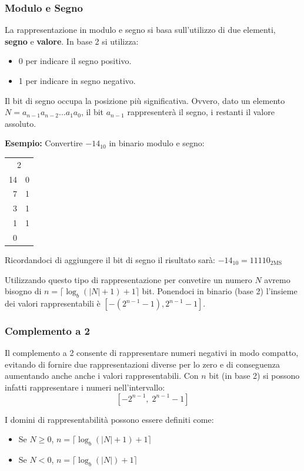 \documentclass[oneside]{scrbook}
\begin{document}
\subsubsection{Modulo e Segno}
La rappresentazione in modulo e segno si basa sull'utilizzo di due elementi, \textbf{segno} e \textbf{valore}.
In base 2 si utilizza:
\begin{itemize}
    \item 0 per indicare il segno positivo.
    \item 1 per indicare in segno negativo. 
\end{itemize}
Il bit di segno occupa la posizione più significativa. Ovvero, dato un elemento $N = a_{n-1}a_{n-2}...a_1a_0$, il bit $a_{n-1}$ rappresenterà il segno, i restanti il valore assoluto. 

\textbf{Esempio:}  
Convertire $-14_{10}$ in binario modulo e segno:

\begin{center}
\begin{tabular}{r|r}
    \multicolumn{2}{c}{2} \\
    14 & 0 \\
    7 & 1 \\
    3 & 1 \\
    1 & 1 \\
    0
\end{tabular}
\end{center}

Ricordandoci di aggiungere il bit di segno il risultato sarà: $-14_{10} = 11110_{2\text{MS}}$

Utilizzando questo tipo di rappresentazione per convetire un numero $N$ avremo bisogno di $n = \lceil \log_b(|N| + 1) +1 \rceil$ bit. Ponendoci in binario (base 2) l'insieme dei valori rappresentabili è $[-(2^{n-1}-1), 2^{n-1}-1]$.

\subsubsection{Complemento a 2}
Il complemento a 2 consente di rappresentare numeri negativi in modo compatto, evitando di fornire due rappresentazioni diverse per lo zero e di conseguenza aumentando anche anche i valori rappresentabili. Con $n$ bit (in base 2) si possono infatti rappresentare i numeri nell’intervallo:
\[
[-2^{n-1}, \; 2^{n-1}-1]
\]

I domini di rappresentabilità possono essere definiti come:
\begin{itemize}
    \item Se $N \geq 0$, $n = \lceil \log_b(|N| + 1) +1 \rceil$
    \item Se $N < 0$, $n = \lceil \log_b(|N|) +1 \rceil$
\end{itemize}
\end{document}
